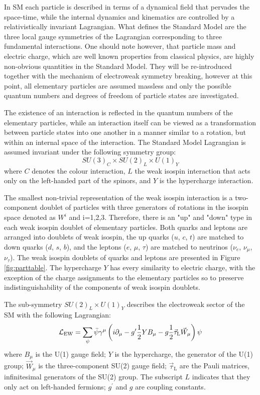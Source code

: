 In SM each particle is described
in terms of a dynamical field that pervades the space-time, while the internal dynamics 
and kinematics are controlled by a relativistically invariant Lagrangian.
What defines the Standard Model are the three local gauge symmetries of the Lagrangian
corresponding to three fundamental interactions.
One should note however, that particle mass and electric charge, 
which are well known properties from 
classical physics, are highly non-obvious quantities in the Standard Model. They
will be re-introduced together with the mechanism of electroweak symmetry breaking, however
at this point,
all elementary particles are assumed massless and only the possible quantum numbers
and degrees of freedom of particle states are investigated.

The existence of an interaction is reflected in the quantum numbers of the elementary
particles, while an interaction itself can be viewed as a transformation between particle states
into one another in a manner similar to a rotation, but within an internal space of the interaction.
The Standard Model Lagrangian is assumed invariant under the following symmetry group:
\begin{equation}
SU(3)_C \times SU(2)_L \times U(1)_Y
\label{eqn:symSM}
\end{equation}
where $C$ denotes the colour interaction, $L$ the weak isospin interaction 
that acts only on the left-handed part of the spinors, and $Y$ is the hypercharge
interaction.

The smallest non-trivial representation of the weak isospin interaction is
a two-component doublet of particles with three generators
of rotations in the isospin space denoted as $W^i$ and i=1,2,3.
Therefore, there is an "up" and "down" type in each weak isospin doublet of elementary particles.
Both quarks and leptons are arranged into doublets of weak isospin, the up quarks ($u$, $c$, $t$)
are matched to down quarks ($d$, $s$, $b$), and the leptons ($e$, $\mu$, $\tau$) are matched
to neutrinos ($\nu_e$, $\nu_{\mu}$, $\nu_{\tau}$). The weak isospin doublets of quarks and leptons
are presented in Figure \ref{fig:parttable}.  
The hypercharge $Y$ has every similarity to electric charge, with the exception of the
charge assignments to the elementary particles so to preserve indistinguishability of the components
of weak isospin doublets.

The sub-symmetry $SU(2)_L \times U(1)_Y$ describes the electroweak sector of the SM with the 
following Lagrangian:
\begin{equation}
\mathcal{L}_\mathrm{EW} = \sum_\psi\bar\psi\gamma^\mu \left(i\partial_\mu-g^\prime{1\over2}YB_\mu-g{1\over2}\vec\tau_\mathrm{L}\vec W_\mu\right)\psi
\label{eqn:LagrEWK}
\end{equation}
where $B_{\mu}$ is the U(1) gauge field; $Y$ is the hypercharge, the generator of 
the U(1) group; $\vec{W}_\mu$ is the three-component SU(2) gauge field; $\vec{\tau}_\mathrm{L}$
 are the Pauli matrices, infinitesimal generators of the SU(2) group. 
The subscript $L$ indicates that they only act on left-handed fermions; $g^{'}$ and $g$
 are coupling constants.


